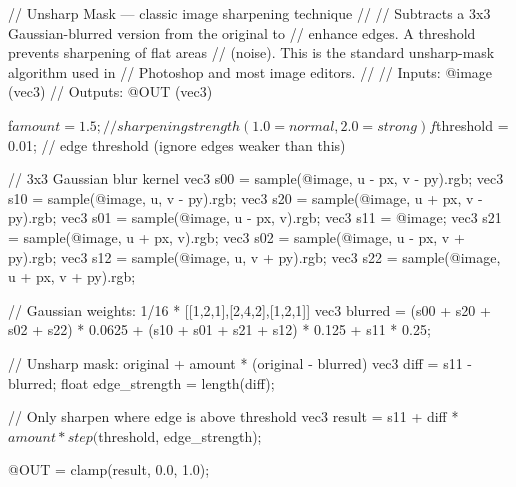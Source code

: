 // Unsharp Mask — classic image sharpening technique
//
// Subtracts a 3x3 Gaussian-blurred version from the original to
// enhance edges. A threshold prevents sharpening of flat areas
// (noise). This is the standard unsharp-mask algorithm used in
// Photoshop and most image editors.
//
// Inputs:  @image (vec3)
// Outputs: @OUT   (vec3)

f$amount = 1.5;       // sharpening strength (1.0 = normal, 2.0 = strong)
f$threshold = 0.01;   // edge threshold (ignore edges weaker than this)

// 3x3 Gaussian blur kernel
vec3 s00 = sample(@image, u - px, v - py).rgb;
vec3 s10 = sample(@image, u,      v - py).rgb;
vec3 s20 = sample(@image, u + px, v - py).rgb;
vec3 s01 = sample(@image, u - px, v).rgb;
vec3 s11 = @image;
vec3 s21 = sample(@image, u + px, v).rgb;
vec3 s02 = sample(@image, u - px, v + py).rgb;
vec3 s12 = sample(@image, u,      v + py).rgb;
vec3 s22 = sample(@image, u + px, v + py).rgb;

// Gaussian weights: 1/16 * [[1,2,1],[2,4,2],[1,2,1]]
vec3 blurred = (s00 + s20 + s02 + s22) * 0.0625
             + (s10 + s01 + s21 + s12) * 0.125
             + s11 * 0.25;

// Unsharp mask: original + amount * (original - blurred)
vec3 diff = s11 - blurred;
float edge_strength = length(diff);

// Only sharpen where edge is above threshold
vec3 result = s11 + diff * $amount * step($threshold, edge_strength);

@OUT = clamp(result, 0.0, 1.0);
